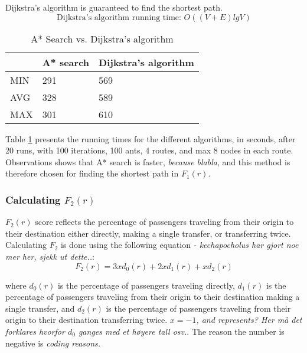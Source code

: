 Dijkstra's algorithm is guaranteed to find the shortest path\cite[p.~661]{cormen09}.
$$\text{Dijkstra's algorithm running time: } O((V + E)lg V)$$

\begin{table}[H]
    \begin{center}
        \begin{tabular}{|l|l|l|}
      \hline
      ~ & A* search & Dijkstra's algorithm\\
      \hline
        MIN & 291 & 569 \\
        AVG & 328 & 589 \\
        MAX & 301 & 610 \\
      \hline
        \end{tabular}
    \end{center}
    \caption {A* Search vs. Dijkstra's algorithm}
    \label{table:astarvsdijkstras}
\end{table}

Table \ref{table:astarvsdijkstras} presents the running times for the different algorithms, in seconds, after 20 runs, with 100 iterations, 100 ants, 4 routes,  and max 8 nodes in each route. Observations shows that A* search is faster, \emph{\color{red} because blabla}, and this method is therefore chosen for finding the shortest path in $F_1(r)$.


 

\subsubsection{Calculating $F_{2}(r)$}
$F_{2}(r)$ score reflects the percentage of passengers traveling from their origin to their destination either directly, making a single transfer, or transferring twice. Calculating $F_{2}$ is done using the following equation \emph{\color{red} -  kechapocholus har gjort noe mer her, sjekk ut dette..}:
$$F_2(r) = 3xd_0(r)+ 2xd_1(r)+ xd_2(r) $$

where  $d_0(r)$ is the percentage of passengers traveling directly, $d_1(r)$ is the percentage of passengers traveling from their origin to their destination making a single transfer, and $d_2(r)$ is the percentage of passengers traveling from their origin to their destination transferring twice. \emph{\color{red}$x=-1$, and represents? Her må det forklares hvorfor $d_0$ ganges med et høyere tall osv.}. The reason the number is negative is \emph{\color{red}coding reasons. } 

